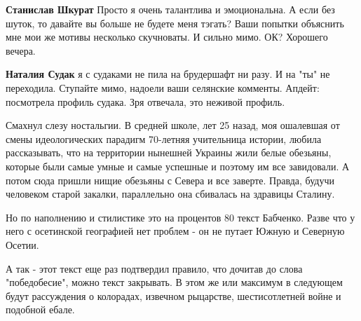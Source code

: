 \begin{itemize}
\begin{itemize}
 
\textbf{Станислав Шкурат} Просто я очень талантлива и эмоциональна. \Smiley[1.0][yellow] А если без шуток, то давайте вы больше не будете меня тэгать? Ваши попытки объяснить мне мои же мотивы несколько скучноваты. И сильно мимо. ОК? Хорошего вечера.

 
\textbf{Наталия Судак} я с судаками не пила на брудершафт ни разу. И на "ты" не переходила. Ступайте мимо, надоели ваши селянские комменты. Апдейт: посмотрела профиль судака. Зря отвечала, это неживой профиль.

\end{itemize}

 

Смахнул слезу ностальгии. В средней школе, лет 25 назад, моя ошалевшая от смены
идеологических парадигм 70-летняя учительница истории, любила рассказывать, что
на территории нынешней Украины жили белые обезьяны, которые были самые умные и
самые успешные и поэтому им все завидовали. А потом сюда пришли нищие обезьяны
с Севера и все заверте. Правда, будучи человеком старой закалки, параллельно
она сбивалась на здравицы Сталину.

Но по наполнению и стилистике это на процентов 80 текст Бабченко. Разве что у
него с осетинской географией нет проблем - он не путает Южную и Северную
Осетии.

А так - этот текст еще раз подтвердил правило, что дочитав до слова
"победобесие", можно текст закрывать. В этом же или максимум в следующем будут
рассуждения о колорадах, извечном рыцарстве, шестисотлетней войне и подобной
ебале.

 


\end{itemize}
